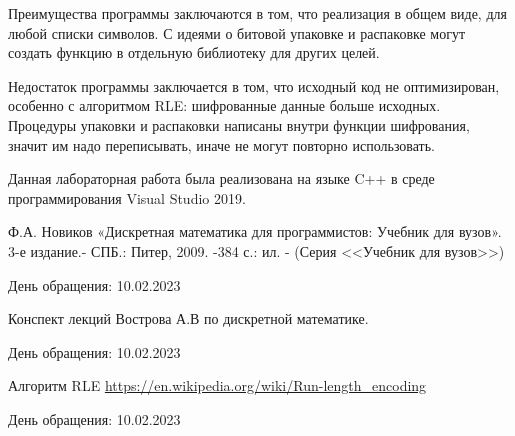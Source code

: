 \documentclass[12pt]{article} %
\begin{document}
	 Преимущества программы заключаются в том, что реализация в общем виде, для любой списки символов. С идеями о битовой 	упаковке и распаковке могут создать функцию в отдельную библиотеку для других целей. 
	
	 Недостаток программы заключается в том, что исходный код не оптимизирован, особенно с алгоритмом RLE: шифрованные данные больше исходных. Процедуры упаковки и распаковки написаны внутри функции шифрования, значит им надо переписывать, иначе не могут повторно использовать. 
	
	 Данная лабораторная работа была реализована на языке C++ в среде программирования Visual Studio 2019.
\newpage
\begin{thebibliography}{3}
Ф.А. Новиков «Дискретная математика для программистов: Учебник для вузов». 3-е издание.- СПБ.: Питер, 2009. -384 с.: ил. - (Серия <<Учебник для вузов>>)

День обращения: 10.02.2023

 Конспект лекций Вострова А.В по дискретной математике.

День обращения: 10.02.2023

Алгоритм RLE
\url{https://en.wikipedia.org/wiki/Run-length_encoding}

День обращения: 10.02.2023
\end{thebibliography}
\end{document}
